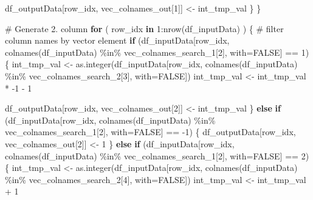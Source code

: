 \documentclass[
]{article}
\newenvironment{Shaded}{\begin{snugshade}}{\end{snugshade}}
\newcommand{\AttributeTok}[1]{\textcolor[rgb]{0.00,0.34,0.68}{#1}}
\newcommand{\CommentTok}[1]{\textcolor[rgb]{0.54,0.53,0.53}{#1}}
\newcommand{\ConstantTok}[1]{\textcolor[rgb]{0.67,0.33,0.00}{#1}}
\newcommand{\ControlFlowTok}[1]{\textcolor[rgb]{0.12,0.11,0.11}{\textbf{#1}}}
\newcommand{\DecValTok}[1]{\textcolor[rgb]{0.69,0.50,0.00}{#1}}
\newcommand{\FunctionTok}[1]{\textcolor[rgb]{0.39,0.29,0.61}{#1}}
\newcommand{\NormalTok}[1]{\textcolor[rgb]{0.12,0.11,0.11}{#1}}
\newcommand{\OtherTok}[1]{\textcolor[rgb]{0.00,0.43,0.16}{#1}}
\newcommand{\SpecialCharTok}[1]{\textcolor[rgb]{0.24,0.68,0.91}{#1}}
\begin{document}
\begin{Shaded}
\begin{Highlighting}[]
\NormalTok{      df\_outputData[row\_idx, vec\_colnames\_out[}\DecValTok{1}\NormalTok{]] }\OtherTok{\textless{}{-}}\NormalTok{ int\_tmp\_val}
\NormalTok{    \}}
\NormalTok{  \}}
  
  \CommentTok{\# Generate 2. column}
  \ControlFlowTok{for}\NormalTok{ ( row\_idx }\ControlFlowTok{in} \DecValTok{1}\SpecialCharTok{:}\FunctionTok{nrow}\NormalTok{(df\_inputData) ) \{}
    \CommentTok{\# filter column names by vector element}
    \ControlFlowTok{if}\NormalTok{ (df\_inputData[row\_idx, }\FunctionTok{colnames}\NormalTok{(df\_inputData) }\SpecialCharTok{\%in\%}\NormalTok{ vec\_colnames\_search\_1[}\DecValTok{2}\NormalTok{], }\AttributeTok{with=}\ConstantTok{FALSE}\NormalTok{] }\SpecialCharTok{==} \DecValTok{1}\NormalTok{) \{}
\NormalTok{      int\_tmp\_val }\OtherTok{\textless{}{-}} \FunctionTok{as.integer}\NormalTok{(df\_inputData[row\_idx, }\FunctionTok{colnames}\NormalTok{(df\_inputData) }\SpecialCharTok{\%in\%}\NormalTok{ vec\_colnames\_search\_2[}\DecValTok{3}\NormalTok{], }\AttributeTok{with=}\ConstantTok{FALSE}\NormalTok{])}
\NormalTok{      int\_tmp\_val }\OtherTok{\textless{}{-}}\NormalTok{ int\_tmp\_val }\SpecialCharTok{*} \SpecialCharTok{{-}}\DecValTok{1} \SpecialCharTok{{-}} \DecValTok{1}
      
\NormalTok{      df\_outputData[row\_idx, vec\_colnames\_out[}\DecValTok{2}\NormalTok{]] }\OtherTok{\textless{}{-}}\NormalTok{ int\_tmp\_val}
\NormalTok{    \} }
    \ControlFlowTok{else} \ControlFlowTok{if}\NormalTok{ (df\_inputData[row\_idx, }\FunctionTok{colnames}\NormalTok{(df\_inputData) }\SpecialCharTok{\%in\%}\NormalTok{ vec\_colnames\_search\_1[}\DecValTok{2}\NormalTok{], }\AttributeTok{with=}\ConstantTok{FALSE}\NormalTok{] }\SpecialCharTok{==} \SpecialCharTok{{-}}\DecValTok{1}\NormalTok{) \{}
\NormalTok{      df\_outputData[row\_idx, vec\_colnames\_out[}\DecValTok{2}\NormalTok{]] }\OtherTok{\textless{}{-}} \DecValTok{1}
\NormalTok{    \} }
    \ControlFlowTok{else} \ControlFlowTok{if}\NormalTok{ (df\_inputData[row\_idx, }\FunctionTok{colnames}\NormalTok{(df\_inputData) }\SpecialCharTok{\%in\%}\NormalTok{ vec\_colnames\_search\_1[}\DecValTok{2}\NormalTok{], }\AttributeTok{with=}\ConstantTok{FALSE}\NormalTok{] }\SpecialCharTok{==} \DecValTok{2}\NormalTok{) \{}
\NormalTok{      int\_tmp\_val }\OtherTok{\textless{}{-}} \FunctionTok{as.integer}\NormalTok{(df\_inputData[row\_idx, }\FunctionTok{colnames}\NormalTok{(df\_inputData) }\SpecialCharTok{\%in\%}\NormalTok{ vec\_colnames\_search\_2[}\DecValTok{4}\NormalTok{], }\AttributeTok{with=}\ConstantTok{FALSE}\NormalTok{])}
\NormalTok{      int\_tmp\_val }\OtherTok{\textless{}{-}}\NormalTok{ int\_tmp\_val }\SpecialCharTok{+} \DecValTok{1}
      

\end{Highlighting}
\end{Shaded}
\end{document}
